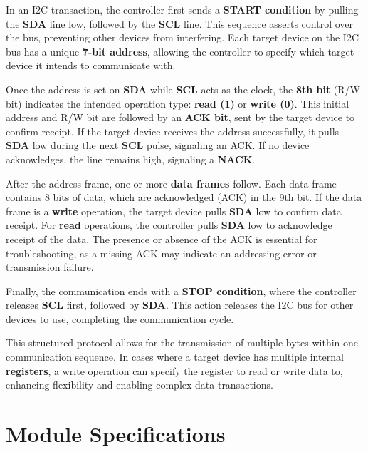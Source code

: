 \documentclass[a4paper,12pt]{report}
\begin{document}
In an I2C transaction, the controller first sends a \textbf{START condition} by pulling the \textbf{SDA} line low, followed by the \textbf{SCL} line. This sequence asserts control over the bus, preventing other devices from interfering. Each target device on the I2C bus has a unique \textbf{7-bit address}, allowing the controller to specify which target device it intends to communicate with.

\vspace{0.25in}

Once the address is set on \textbf{SDA} while \textbf{SCL} acts as the clock, the \textbf{8th bit} (R/W bit) indicates the intended operation type: \textbf{read (1)} or \textbf{write (0)}. This initial address and R/W bit are followed by an \textbf{ACK bit}, sent by the target device to confirm receipt. If the target device receives the address successfully, it pulls \textbf{SDA} low during the next \textbf{SCL} pulse, signaling an ACK. If no device acknowledges, the line remains high, signaling a \textbf{NACK}.

\vspace{0.25in}

After the address frame, one or more \textbf{data frames} follow. Each data frame contains 8 bits of data, which are acknowledged (ACK) in the 9th bit. If the data frame is a \textbf{write} operation, the target device pulls \textbf{SDA} low to confirm data receipt. For \textbf{read} operations, the controller pulls \textbf{SDA} low to acknowledge receipt of the data. The presence or absence of the ACK is essential for troubleshooting, as a missing ACK may indicate an addressing error or transmission failure.

\vspace{0.25in}

Finally, the communication ends with a \textbf{STOP condition}, where the controller releases \textbf{SCL} first, followed by \textbf{SDA}. This action releases the I2C bus for other devices to use, completing the communication cycle.

\vspace{0.25in}

This structured protocol allows for the transmission of multiple bytes within one communication sequence. In cases where a target device has multiple internal \textbf{registers}, a write operation can specify the register to read or write data to, enhancing flexibility and enabling complex data transactions.


\chapter{Module Specifications}
\end{document}
